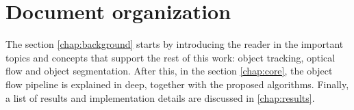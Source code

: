\section{Document organization}

The section \ref{chap:background} starts by introducing the reader in the important topics and concepts that support the rest of this work: 
object tracking, optical flow and object segmentation. After this, in the section \ref{chap:core}, the object flow pipeline is explained in deep, 
together with the proposed algorithms. Finally, a list of results and implementation details are discussed in \ref{chap:results}.


